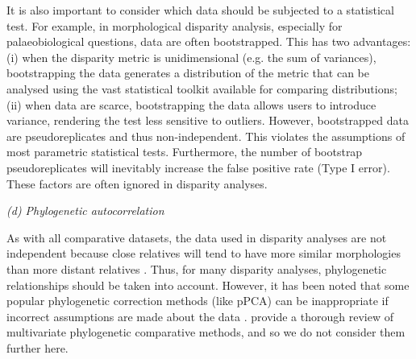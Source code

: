 \documentclass[12pt,letterpaper]{article}
\renewcommand{\subsection}[1]{%
\bigskip
\begin{center}
\begin{large}
\normalfont\itshape #1
\end{large}
\end{center}}
\begin{document}
It is also important to consider which data should be subjected to a statistical test.
For example, in morphological disparity analysis, especially for palaeobiological questions, data are often bootstrapped.
This has two advantages: (i) when the disparity metric is unidimensional (e.g. the sum of variances), bootstrapping the data generates a distribution of the metric that can be analysed using the vast statistical toolkit available for comparing distributions; (ii) when data are scarce, bootstrapping the data allows users to introduce variance, rendering the test less sensitive to outliers.
However, bootstrapped data are pseudoreplicates and thus non-independent.
This violates the assumptions of most parametric statistical tests.
Furthermore, the number of bootstrap pseudoreplicates will inevitably increase the false positive rate (Type I error).
These factors are often ignored in disparity analyses.

\subsection{(d) Phylogenetic autocorrelation}

As with all comparative datasets, the data used in disparity analyses are not independent because close relatives will tend to have more similar morphologies than more distant relatives \citep{Harvey1998-xg}.
Thus, for many disparity analyses, phylogenetic relationships should be
taken into account.
However, it has been noted that some popular phylogenetic correction methods (like pPCA) can be inappropriate
if incorrect assumptions are made about the data \citep{Uyeda2015}.
provide a thorough review of multivariate phylogenetic comparative methods, and so we do not consider them further here.
\end{document}
